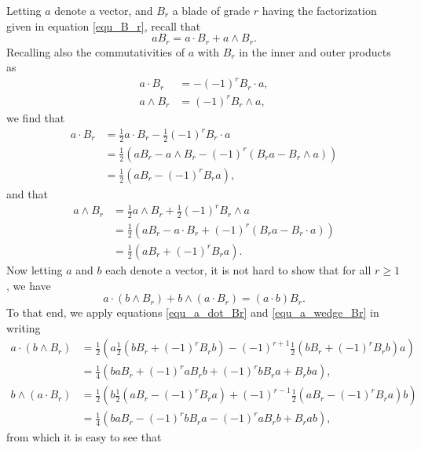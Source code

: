 \documentclass{birkjour}
\theoremstyle{definition}
\theoremstyle{remark}
\numberwithin{equation}{section}
\begin{document}
Letting $a$ denote a vector, and $B_r$ a blade of grade $r$ having the factorization
given in equation \eqref{equ_B_r}, recall that
\begin{equation}\label{equ_aBr_is_a_dot_Br_and_a_wedge_Br}
aB_r = a\cdot B_r + a\wedge B_r.
\end{equation}
Recalling also the commutativities of $a$ with $B_r$ in the inner and outer products as
\begin{align}
a\cdot B_r &= -(-1)^r B_r\cdot a,\label{equ_a_dot_Br_commutativity} \\
a\wedge B_r &= (-1)^r B_r\wedge a,\label{equ_a_wedge_Br_commutativity}
\end{align}
we find that
\begin{align}
a\cdot B_r &= \frac{1}{2}a\cdot B_r - \frac{1}{2}(-1)^r B_r\cdot a\nonumber \\
 &= \frac{1}{2}(aB_r - a\wedge B_r - (-1)^r(B_ra - B_r\wedge a))\nonumber \\
 &= \frac{1}{2}(aB_r-(-1)^rB_ra),\label{equ_a_dot_Br}
\end{align}
and that
\begin{align}
a\wedge B_r &= \frac{1}{2}a\wedge B_r + \frac{1}{2}(-1)^r B_r\wedge a\nonumber \\
 &= \frac{1}{2}(aB_r - a\cdot B_r + (-1)^r(B_ra - B_r\cdot a))\nonumber \\
 &= \frac{1}{2}(aB_r+(-1)^rB_ra).\label{equ_a_wedge_Br}
\end{align}
Now letting $a$ and $b$ each denote a vector, it is not hard to show that for all $r\geq 1$, we have
\begin{equation}\label{equ_a_dot_b_wedge_Br_identity}
a\cdot(b\wedge B_r) + b\wedge(a\cdot B_r) = (a\cdot b)B_r.
\end{equation}
To that end, we apply equations \eqref{equ_a_dot_Br} and \eqref{equ_a_wedge_Br} in writing
\begin{align*}
a\cdot(b\wedge B_r)
 &= \frac{1}{2}\left(a\frac{1}{2}\left(bB_r + (-1)^rB_rb\right)-(-1)^{r+1}\frac{1}{2}\left(bB_r+(-1)^rB_rb\right)a\right) \\
 &= \frac{1}{4}\left(baB_r + (-1)^raB_rb + (-1)^rbB_ra + B_rba\right), \\
b\wedge(a\cdot B_r)
 &= \frac{1}{2}\left(b\frac{1}{2}\left(aB_r-(-1)^rB_ra\right)+(-1)^{r-1}\frac{1}{2}\left(aB_r-(-1)^rB_ra\right)b\right) \\
 &= \frac{1}{4}\left(baB_r - (-1)^rbB_ra - (-1)^raB_rb + B_rab\right),
\end{align*}
from which it is easy to see that
\end{document}
